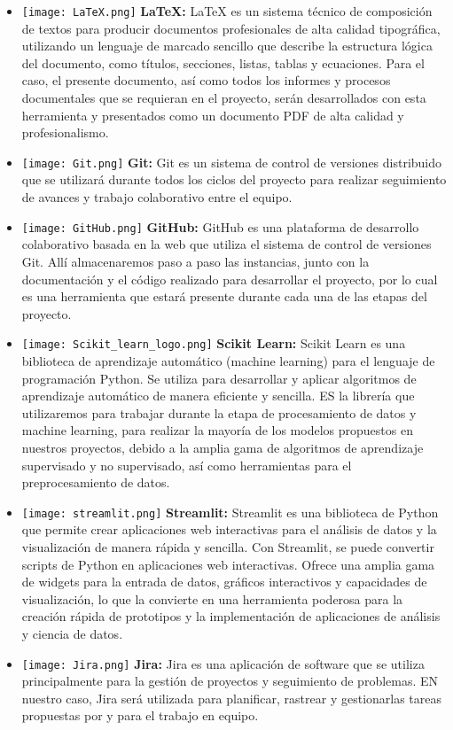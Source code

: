 \documentclass[12pt]{article}
\begin{document}
\begin{itemize}
    \item \texttt{[image: LaTeX.png]}
    \textbf{\LaTeX{}:} LaTeX es un sistema técnico de composición de textos  para producir documentos profesionales de alta calidad tipográfica, utilizando un lenguaje de marcado sencillo que describe la estructura lógica del documento, como títulos, secciones, listas, tablas y ecuaciones.
    Para el caso, el presente documento, así como todos los informes y procesos documentales que se requieran en el proyecto, serán desarrollados con esta herramienta y presentados como un documento PDF de alta calidad y profesionalismo. 

    \item \texttt{[image: Git.png]}
    \textbf{Git:} Git es un sistema de control de versiones distribuido que se utilizará durante todos los ciclos del proyecto para realizar seguimiento de avances y trabajo colaborativo entre el equipo.

    \item \texttt{[image: GitHub.png]}
    \textbf{GitHub:} GitHub es una plataforma de desarrollo colaborativo basada en la web que utiliza el sistema de control de versiones Git. Allí almacenaremos paso a paso las instancias, junto con la documentación y el código realizado para desarrollar el proyecto, por lo cual es una herramienta que estará presente durante cada una de las etapas del proyecto.

    \item \texttt{[image: Scikit\_learn\_logo.png]}
    \textbf{Scikit Learn:} Scikit Learn es una biblioteca de aprendizaje automático (machine learning) para el lenguaje de programación Python. Se utiliza para desarrollar y aplicar algoritmos de aprendizaje automático de manera eficiente y sencilla. ES la librería que utilizaremos para trabajar durante la etapa de procesamiento de datos y machine learning, para realizar la mayoría de los modelos propuestos en nuestros proyectos, debido a la amplia gama de algoritmos de aprendizaje supervisado y no supervisado, así como herramientas para el preprocesamiento de datos.

    \item \texttt{[image: streamlit.png]}
    \textbf{Streamlit:} Streamlit es una biblioteca de Python  que permite crear aplicaciones web interactivas para el análisis de datos y la visualización de manera rápida y sencilla. Con Streamlit, se puede convertir scripts de Python en aplicaciones web interactivas. Ofrece una amplia gama de widgets para la entrada de datos, gráficos interactivos y capacidades de visualización, lo que la convierte en una herramienta poderosa para la creación rápida de prototipos y la implementación de aplicaciones de análisis y ciencia de datos.

    \item \texttt{[image: Jira.png]}
    \textbf{Jira:} Jira es una aplicación de software que se utiliza principalmente para la gestión de proyectos y seguimiento de problemas. EN nuestro caso, Jira será utilizada para planificar, rastrear y gestionarlas tareas propuestas por y para el trabajo en equipo.
\end{itemize}    
\end{document}
